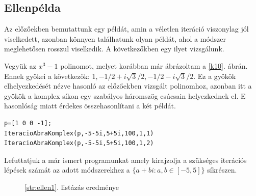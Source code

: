 \documentclass[a4paper,12pt]{report}
\begin{document}
			\subsection{Ellenpélda}
                Az előzőekben bemutattunk egy példát, amin a véletlen iteráció viszonylag jól viselkedett, azonban könnyen találhatunk olyan példát, ahol a módszer meglehetősen rosszul viselkedik. A következőkben egy ilyet vizsgálunk.

                Vegyük az $x^3-1$ polinomot, melyet korábban már ábrázoltam a \ref{k10}. ábrán. Ennek gyökei a következők: $1, -1/2+i\sqrt{3}/2, -1/2-i\sqrt{3}/2$. Ez a gyökök elhelyezkedését nézve hasonló az előzőekben vizsgált polinomhoz, azonban itt a gyökök a komplex síkon egy szabályos háromszög csúcsain helyezkednek el. E hasonlóság miatt érdekes összehasonlítani a két példát.
                \begin{singlespace}
                \begin{lstlisting}[caption=Bemenet,label=str:ellen1]
p=[1 0 0 -1];
IteracioAbraKomplex(p,-5-5i,5+5i,100,1,1)
IteracioAbraKomplex(p,-5-5i,5+5i,100,1,2)
                \end{lstlisting}
                \end{singlespace}
                Lefuttatjuk a már ismert programunkat amely kirajzolja a szükséges iterációs lépések számát az adott módszerekhez a $\{a+bi:a,b\in[-5,5]\}$ síkrészen.
                           \begin{figure}[hp]
					\centering
			        \caption{\ref{str:ellen1}. listázás eredménye}
				\end{figure}
\end{document}
